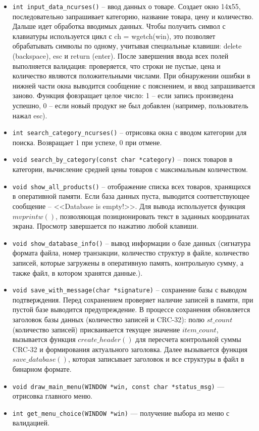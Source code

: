 \documentclass[14pt]{extreport}
\begin{document}
{\begin{itemize}
    \item \texttt{int input\_data\_ncurses()} --  ввод данных о товаре. Создает окно 14х55, последовательно запрашивает категорию, название товара, цену и количество. Дальше идет обработка
вводимых данных. Чтобы получить символ с клавиатуры используется цикл с ch = wgetch(win), это позволяет обрабатывать символы по одному, учитывая специальные клавиши: delete (backspace), esc и return (enter). 
После завершения ввода всех полей выполняется валидация: проверяется, что строки не пустые, цена и количество являются положительными числами. При обнаружении ошибки
в нижней части окна выводится сообщение с пояснением, и ввод запрашивается заново. Функция фовзращает целое число: 1 -- если запись произведена успешно, 0 -- если новый продукт не был добавлен (например, пользователь нажал esc).
    \item \texttt{int search\_category\_ncurses()} -- отрисовка окна с вводом категории для поиска. Возвращает 1 при успехе, 0 при отмене.
    \item \texttt{void search\_by\_category(const char *category)} --  поиск товаров в категории, вычисление средней цены товаров с максимальным количеством.
    \item \texttt{void show\_all\_products()} -- отображение списка всех товаров, хранящихся в оперативной памяти. Если база данных пуста, выводится соответствующее сообщение -- <<Database is empty!>>. Для вывода используется функция $mvprintw()$, позволяющая позиционировать текст в заданных координатах экрана. Просмотр завершается по нажатию любой клавиши.
    \item \texttt{void show\_database\_info()} -- вывод информации о базе данных (сигнатура формата файла, номер транзакции, количество структур в файле, количество записей, которые загружены в оперативную память, контрольную сумму, а также файл, в котором хранятся данные.).
    \item \texttt{void save\_with\_message(char *signature)} -- сохранение базы с выводом подтверждения. Перед сохранением проверяет наличие записей в памяти, при пустой базе выводится предупреждение. 
В процессе сохранения обновляется заголовок базы данных (количество записей и CRC-32): полю $st\_count$ (количество записей) присваивается текущее значение $item\_count$, вызывается функция $create\_header()$ для пересчета контрольной суммы CRC-32 и формирования актуального заголовка. 
Далее вызывается функция $save\_database()$, которая записывает заголовок и все структуры в файл в бинарном формате.
    \item \texttt{void draw\_main\_menu(WINDOW *win, const char *status\_msg)} — отрисовка главного меню.
    \item \texttt{int get\_menu\_choice(WINDOW *win)} — получение выбора из меню с валидацией.
\end{itemize}

}
\end{document}
